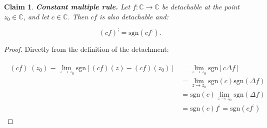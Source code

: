 \documentclass[11pt]{book}
\newtheorem{clm}[thm]{Claim}
\begin{document}
\begin{clm}\textbf{Constant multiple rule.} Let $f:\mathbb{C}\longrightarrow\mathbb{C}$ be detachable at the point $z_{0}\in\mathbb{C}$, and let $c\in\mathbb{C}$. Then $cf$ is also detachable and:

$$\left(cf\right)^{;}=\text{sgn}\left(cf^{;}\right).$$
\label{complex_constant_multiple_rule}
\end{clm}
\begin{proof}Directly from the definition of the detachment:

\begin{align}
\begin{aligned}
\left(cf\right)^{;}\left(z_{0}\right) \equiv\underset{z\to z_{0}}{\lim}\text{sgn}\left[\left(cf\right)\left(z\right)-\left(cf\right)\left(z_{0}\right)\right]
&=\underset{z\to z_{0}}{\lim}\text{sgn}\left[c\Delta f\right] \\
&=\underset{z\to z_{0}}{\lim}\text{sgn}\left(c\right)\text{sgn}\left(\Delta f\right) \\
&=\text{sgn}\left(c\right)\underset{z\to z_{0}}{\lim}\text{sgn}\left(\Delta f\right) \\
&=\text{sgn}\left(c\right)f^{;}=\text{sgn}\left(cf^{;}\right)
\end{aligned}
\end{align}
\end{proof}
\end{document}
